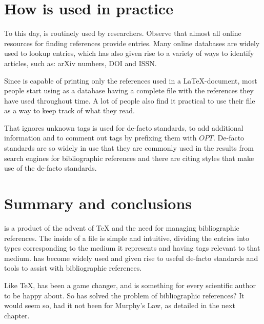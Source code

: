 \section{How {\bibtex} is used in practice}
\label{sec:how_bibtex_is_used_today}

To this day, {\bibtex} is routinely used by researchers.  Observe that
almost all online resources for finding references provide {\bibtex}
entries.  Many online databases are widely used to lookup entries,
which has also given rise to a variety of ways to identify articles,
such as: arXiv numbers, DOI and ISSN.

Since {\bibtex} is capable of printing only the references used in a
{\LaTeX}-document, most people start using {\bibtex} as a database
having a complete file with the references they have used throughout
time.  A lot of people also find it practical to use their {\bibtex}
file as a way to keep track of what they read.

That {\bibtex} ignores unknown tags is used for de-facto standards, to
add additional information and to comment out tags by prefixing them
with $OPT$.  De-facto standards are so widely in use that they are
commonly used in the results from search engines for bibliographic
references and there are citing styles that make use of the de-facto
standards.


\section{Summary and conclusions}
\label{sec:about_conclusion}


{\bibtex} is a product of the advent of {\TeX} and the need for
managing bibliographic references.  The inside of a {\bibtex} file is
simple and intuitive, dividing the entries into types corresponding
to the medium it represents and having tags relevant to that medium.
{\bibtex} has become widely used and given rise to useful de-facto
standards and tools to assist with bibliographic references.

Like {\TeX}, {\bibtex} has been a game changer, and is something for
every scientific author to be happy about.  So has {\bibtex} solved the
problem of bibliographic references? It would seem so, had it not been
for Murphy's Law, as detailed in the next chapter.


%
%
